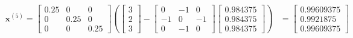 \documentclass[]{article}
\begin{document}
\begin{align*}
    \mathbf{x}^{(5)} = \begin{bmatrix}
        0.25 & 0 & 0\\
        0 & 0.25 & 0\\
        0 & 0 & 0.25
    \end{bmatrix} \left(\begin{bmatrix}
        3\\
        2\\
        3
    \end{bmatrix} - \begin{bmatrix}
        0 & -1 & 0\\
        -1 & 0 & -1\\
        0 & -1 & 0
    \end{bmatrix}\begin{bmatrix}
        0.984375\\
        0.984375\\
        0.984375
    \end{bmatrix}\right)
    &=
    \boxed{\begin{bmatrix}
        0.99609375\\
        0.9921875\\
        0.99609375
    \end{bmatrix}}\\
\end{align*}
\end{document}
